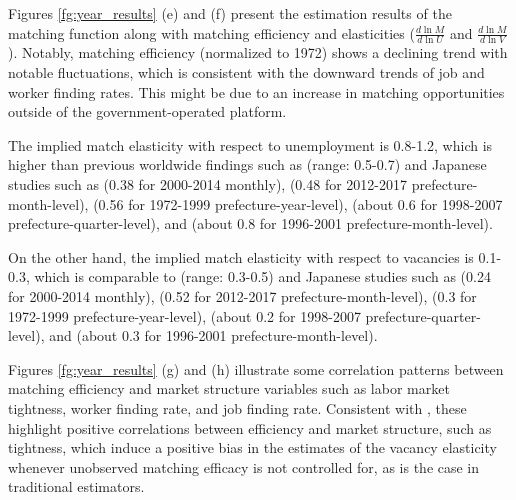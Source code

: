 \documentclass[12pt]{article}
\begin{document}
Figures \ref{fg:year_results} (e) and (f) present the estimation results of the matching function along with matching efficiency and elasticities (\(\frac{d\ln M}{d\ln U}\) and \(\frac{d\ln M}{d\ln V}\)). Notably, matching efficiency (normalized to 1972) shows a declining trend with notable fluctuations, which is consistent with the downward trends of job and worker finding rates. This might be due to an increase in matching opportunities outside of the government-operated platform.

The implied match elasticity with respect to unemployment is 0.8-1.2, which is higher than previous worldwide findings such as \cite{petrongolo2001looking} (range: 0.5-0.7) and Japanese studies such as \cite{higashi2018spatial} (0.38 for 2000-2014 monthly), \cite{kawata2019} (0.48 for 2012-2017 prefecture-month-level), \cite{kano2005estimating} (0.56 for 1972-1999 prefecture-year-level), \cite{sasaki2007measuring} (about 0.6 for 1998-2007 prefecture-quarter-level), and \cite{kambayashi2006vacancy} (about 0.8 for 1996-2001 prefecture-month-level). 

On the other hand, the implied match elasticity with respect to vacancies is 0.1-0.3, which is comparable to \cite{lange2020beyond} (range: 0.3-0.5) and Japanese studies such as \cite{higashi2018spatial} (0.24 for 2000-2014 monthly), \cite{kawata2019} (0.52 for 2012-2017 prefecture-month-level), \cite{kano2005estimating} (0.3 for 1972-1999 prefecture-year-level), \cite{sasaki2007measuring} (about 0.2 for 1998-2007 prefecture-quarter-level), and \cite{kambayashi2006vacancy} (about 0.3 for 1996-2001 prefecture-month-level).

Figures \ref{fg:year_results} (g) and (h) illustrate some correlation patterns between matching efficiency and market structure variables such as labor market tightness, worker finding rate, and job finding rate. Consistent with \cite{lange2020beyond}, these highlight positive correlations between efficiency and market structure, such as tightness, which induce a positive bias in the estimates of the vacancy elasticity whenever unobserved matching efficacy is not controlled for, as is the case in traditional estimators.
\end{document}
